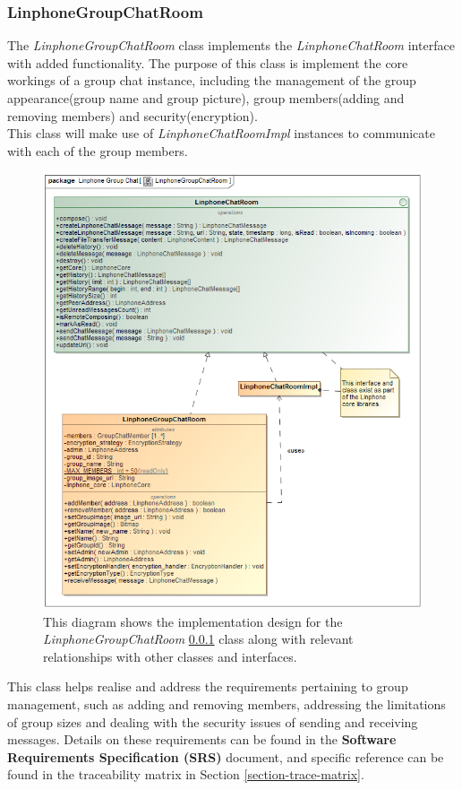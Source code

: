 \documentclass[11pt]{article}
\begin{document}
\subsubsection{LinphoneGroupChatRoom}\label{ssc: linphonegroupchatroom}
The \textit{LinphoneGroupChatRoom} class implements the \textit{LinphoneChatRoom} interface with added functionality. The purpose of this class is implement the core workings of a group chat instance, including the management of the group appearance(group name and group picture), group members(adding and removing members) and security(encryption).\\
This class will make use of \textit{LinphoneChatRoomImpl} instances to communicate with each of the group members.
\begin{figure}[H]
	\centering
	\includegraphics[width=5in]{./images/class_group_chat.png}
	\caption[LinphoneGroupChatRoom Class Diagram]{This diagram shows the implementation design for the \textit{LinphoneGroupChatRoom} \ref{ssc: linphonegroupchatroom} class along with relevant relationships with other classes and interfaces.}
	\label{cd-group-chat}
\end{figure}
This class helps realise and address the requirements pertaining to group management, such as adding and removing members, addressing the limitations of group sizes and dealing with the security issues of sending and receiving messages. Details on these requirements can be found in the \textbf{Software Requirements Specification (SRS)} document, and specific reference can be found in the traceability matrix in Section \ref{section-trace-matrix}.
\end{document}
